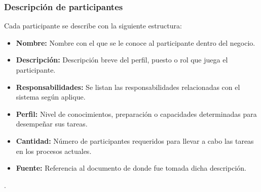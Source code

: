 %

\subsubsection{Descripción de participantes}

Cada participante se describe con la siguiente estructura:
\begin{itemize}
	\item \textbf{Nombre:} Nombre con el que se le conoce al participante 
	dentro del negocio.
	\item \textbf{Descripción:} Descripción breve del perfil, puesto o rol 
	que juega el participante.
	\item \textbf{Responsabilidades:} Se listan las responsabilidades 
	relacionadas con el sistema según aplique.
	\item \textbf{Perfil:} Nivel de conocimientos, preparación o capacidades 
	determinadas para desempeñar sus tareas.
	\item \textbf{Cantidad:} Número de participantes requeridos para llevar 
	a cabo las tareas en los procesos actuales.
	\item \textbf{Fuente:} Referencia al documento de donde fue tomada dicha 
	descripción.
\end{itemize}

. \\
